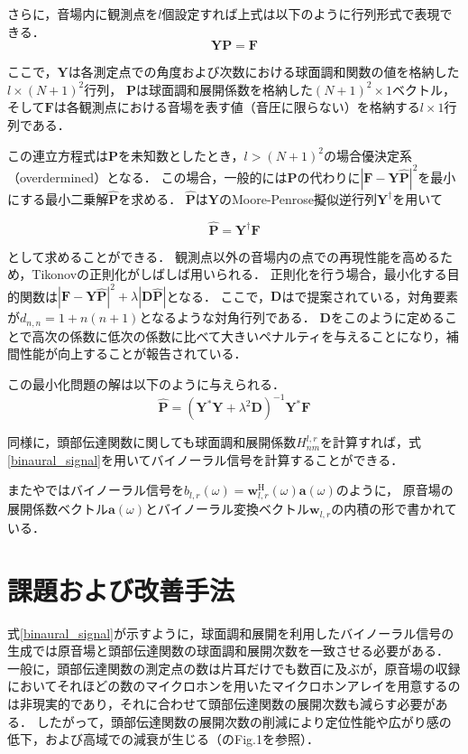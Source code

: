 \documentclass[a4paper]{jsarticle}
\begin{document}
さらに，音場内に観測点を$l$個設定すれば上式は以下のように行列形式で表現できる．
$$
    \mathbf{Y P}=\mathbf{F}
$$

ここで，$\mathbf{Y}$は各測定点での角度および次数における球面調和関数の値を格納した$l \times (N+1)^2$行列，
$\mathbf{P}$は球面調和展開係数を格納した$(N+1)^2 \times 1$ベクトル，
そして$\mathbf{F}$は各観測点における音場を表す値（音圧に限らない）を格納する$l \times 1$行列である．

この連立方程式は$\mathbf{P}$を未知数としたとき，$l > (N+1)^2$の場合優決定系（overdermined）となる．
この場合，一般的には$\mathbf{P}$の代わりに$|\mathbf{F} - \mathbf{Y}\hat{\mathbf{P}}|^2$を最小にする最小二乗解$\hat{\mathbf{P}}$を求める．
$\hat{\mathbf{P}}$は$\mathbf{Y}$のMoore-Penrose擬似逆行列$\mathbf{Y}^\dagger$を用いて

$$
    \hat{\boldsymbol{P}}=\boldsymbol{Y}^{\dagger} \boldsymbol{F}
$$

として求めることができる．
観測点以外の音場内の点での再現性能を高めるため，Tikonovの正則化がしばしば用いられる．
正則化を行う場合，最小化する目的関数は$|\boldsymbol{F}-\boldsymbol{Y} \hat{\boldsymbol{P}}|^{2}+\lambda|\boldsymbol{D} \hat{\boldsymbol{P}}|$となる．
ここで，$\mathbf{D}$は\cite{Duraiswaini2004-fy}で提案されている，対角要素が$d_{n, n} = 1 + n(n+1)$となるような対角行列である．
$\mathbf{D}$をこのように定めることで高次の係数に低次の係数に比べて大きいペナルティを与えることになり，補間性能が向上することが報告されている\cite{Duraiswaini2004-fy}．

この最小化問題の解は以下のように与えられる．
$$
    \hat{\boldsymbol{P}}=\left(\boldsymbol{Y}^{*} \boldsymbol{Y}+\lambda^{2} \boldsymbol{D}\right)^{-1} \boldsymbol{Y}^{*} \boldsymbol{F}
$$

同様に，頭部伝達関数に関しても球面調和展開係数$H_{nm}^{l, r}$を計算すれば，式\ref{binaural_signal}を用いてバイノーラル信号を計算することができる．

また\cite{Schorkhuber2018-ql}や\cite{Zaunschirm2018-mn}ではバイノーラル信号を$\hat{b}_{l, r}(\omega) =\boldsymbol{w}_{l, r}^{\mathrm{H}}(\omega) \boldsymbol{a}(\omega)$のように，
原音場の展開係数ベクトル$\boldsymbol{a}(\omega)$とバイノーラル変換ベクトル$\boldsymbol{w}_{l, r}の$内積の形で書かれている．

\section{課題および改善手法}
式\ref{binaural_signal}が示すように，球面調和展開を利用したバイノーラル信号の生成では原音場と頭部伝達関数の球面調和展開次数を一致させる必要がある．
一般に，頭部伝達関数の測定点の数は片耳だけでも数百に及ぶが，原音場の収録においてそれほどの数のマイクロホンを用いたマイクロホンアレイを用意するのは非現実的であり，それに合わせて頭部伝達関数の展開次数も減らす必要がある．
したがって，頭部伝達関数の展開次数の削減により定位性能や広がり感の低下\cite{Avni2013-sr}，および高域での減衰が生じる\cite{Avni2013-sr, Ben-Hur2017-gm}（\cite{Ben-Hur2017-gm}のFig.1を参照）．
\end{document}
